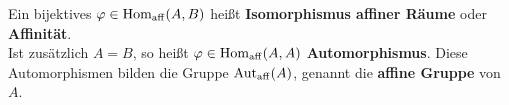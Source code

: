 \documentclass[parskip,a4paper,twoside,DIV15,BCOR12mm]{scrbook}
\begin{document}
\begin{comment}
\begin{enumerate}
\item $\varphi:A\to B$ mit zugehörigem $\Phi\in\Hom(V,W)$ ist genau dann affin, wenn gilt:
\[\exists P_0\in A:\forall x\in V: \varphi(x+P_0)=\Phi(x)+\varphi(P_0)\]
\item Ist $\varphi\in\Homaff(A,B)$, so ist der zugehörige Homomorphismus \mbox{$\Phi=:\Lambda_\varphi$}
eindeutig bestimmt.
\item Die Hintereinanderausführung affiner Abbildungen ist affin, d.h.:
\[\Homaff(A,B)\times\Homaff(B,C)\to \Homaff(A,C), (\varphi,\psi)\mapsto\psi\circ\varphi\]
\item $\varphi\in\Homaff(A,B)$ ist genau dann injektiv (bzw. surjektiv), wenn $\Lambda_\varphi$
injektiv (bzw. surjektiv) ist.
\item Ist $\varphi\in\Homaff(A,B)$ bijektiv, so existiert $\varphi^{-1}\in\Homaff(B,A)$.
\end{enumerate}
\end{comment}

\begin{definition}
Ein bijektives $\varphi\in\operatorname{Hom_{aff}}(A,B)$ heißt \textbf{Isomorphismus affiner Räume} oder \textbf{Affinität}.\\
Ist zusätzlich $A=B$, so heißt $\varphi\in\operatorname{Hom_{aff}}(A,A)$ \textbf{Automorphismus}. Diese Automorphismen
bilden die Gruppe $\operatorname{Aut_{aff}}(A)$, genannt die \textbf{affine Gruppe} von $A$.
\end{definition}
\end{document}
